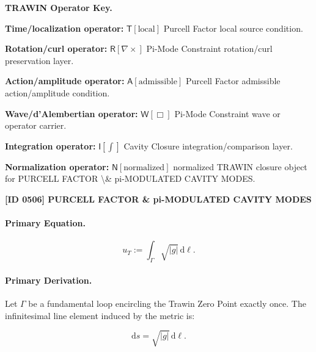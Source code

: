 \par\vspace{0.45\baselineskip}
\noindent\begin{minipage}[t]{\linewidth}
\begingroup
\small
\raggedright
\textbf{TRAWIN Operator Key.}\par
\noindent\textbf{Time/localization operator:} $\mathsf{T}\!\left[\mathrm{local}\right]$ Purcell Factor local source condition.\par
\noindent\textbf{Rotation/curl operator:} $\mathsf{R}\!\left[\nabla\times\right]$ Pi-Mode Constraint rotation/curl preservation layer.\par
\noindent\textbf{Action/amplitude operator:} $\mathsf{A}\!\left[\mathrm{admissible}\right]$ Purcell Factor admissible action/amplitude condition.\par
\noindent\textbf{Wave/d'Alembertian operator:} $\mathsf{W}\!\left[\Box\right]$ Pi-Mode Constraint wave or operator carrier.\par
\noindent\textbf{Integration operator:} $\mathsf{I}\!\left[\int\right]$ Cavity Closure integration/comparison layer.\par
\noindent\textbf{Normalization operator:} $\mathsf{N}\!\left[\mathrm{normalized}\right]$ normalized TRAWIN closure object for PURCELL FACTOR \textbackslash{}\& pi-MODULATED CAVITY MODES.\par
\endgroup
\end{minipage}

\clearpage
\noindent\textbf{[ID 0506] PURCELL FACTOR \& pi-MODULATED CAVITY MODES}\par
\vspace{0.35em}
\paragraph{Primary Equation.}
\begin{equation}
u_T := \int_{\Gamma}\sqrt{|g|}\,\mathrm{d}\ell .
\end{equation}

\paragraph{Primary Derivation.}
Let $\Gamma$ be a fundamental loop encircling the Trawin Zero Point exactly once.  
The infinitesimal line element induced by the metric is:

\begin{equation}
\mathrm{d}s = \sqrt{|g|}\,\mathrm{d}\ell .
\end{equation}

